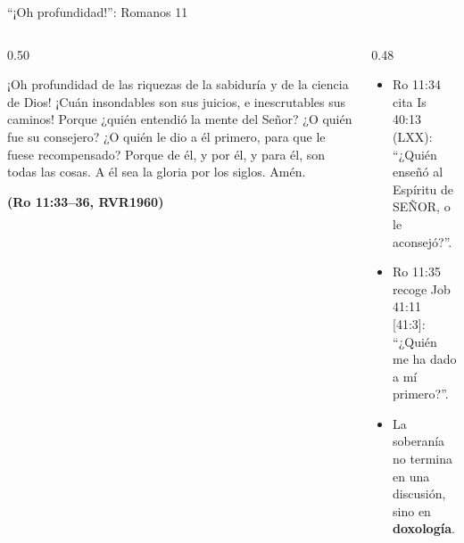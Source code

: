 \documentclass[hyperref={bookmarks=false},aspectratio=169]{beamer}
\newcommand{\grc}[1]{\foreignlanguage{ancientgreek}{#1}}
\newcommand{\SENOR}{S{\fontsize{0.78em}{1em}\selectfont EÑOR}}
\newcommand{\fuente}[1]{\par\hfill{\upshape\bfseries\footnotesize\textcolor{azul}{#1}}}
\newcommand{\destacar}[1]{\textbf{\textcolor{azul}{#1}}}
\begin{document}
\begin{frame}{``¡Oh profundidad!'': Romanos 11}
\begin{columns}[t,onlytextwidth]
\begin{column}{0.50\textwidth}
\begin{cita}¡Oh profundidad de las riquezas de la sabiduría y de la ciencia de Dios! ¡Cuán insondables son sus juicios, e inescrutables sus caminos! Porque ¿quién entendió la mente del Señor? ¿O quién fue su consejero? ¿O quién le dio a él primero, para que le fuese recompensado? Porque de él, y por él, y para él, son todas las cosas. A él sea la gloria por los siglos. Amén.\fuente{(Ro 11:33--36, RVR1960)}\end{cita}
\end{column}
\begin{column}{0.48\textwidth}\small
\begin{itemize}
\item Ro 11:34 cita Is 40:13 (LXX): ``¿Quién enseñó al Espíritu de \SENOR, o le aconsejó?''.
\item Ro 11:35 recoge Job 41:11 [41:3]: ``¿Quién me ha dado a mí primero?''.
\item La soberanía no termina en una discusión, sino en \destacar{doxología}.
\end{itemize}
\centering
{}
\end{column}
\end{columns}
\end{frame}
\end{document}
